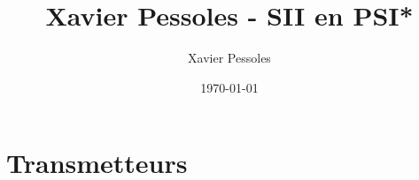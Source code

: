\documentclass[
	fontsize=10pt, %
	twoside=true, %
]{kaobook}
\newcommand{\repRel}{../../..}
\newcommand{\repStyle}{\repRel/Style}
\begin{document}

\titlehead{Xavier Pessoles - SII en PSI*}
\title[Xavier Pessoles - SII en PSI*]{Xavier Pessoles - SII en PSI*}
\author[XP]{Xavier Pessoles}
\date{\today}


\begingroup %
\endgroup

%
\mainmatter %
%
%
%
%


\setcounter{margintocdepth}{\sectiontocdepth}
\marginlayout
\graphicspath{{\repStyle/png}}

\pagestyle{xp.scrheadings}


%



\newcommand{\repExo}{Application_01_ROV}
\newcommand{\nomExo}{Application_01_ROV}

\livrettrue %
\livrettrue
\colletrue



\chapter*{Transmetteurs}
\renewcommand{\repExo}{91_PorteAvion}
\graphicspath{{\repRel/Style/png/}{\repRel/ExercicesCompetences/C2_MettreEnOeuvreDemarche/C2_06_Transmetteurs/\repExo/images/}}

%
\newpage
\end{document}
